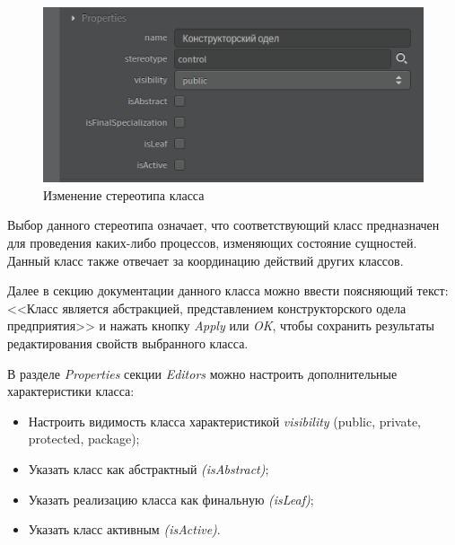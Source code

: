 \documentclass[a4paper,12pt]{report}
\begin{document}
\begin{figure}[h!]
	\centering
	\includegraphics[width=0.7\linewidth]{images/classeditors}
	\caption{Изменение стереотипа класса}
	\label{fig:classeditors}
\end{figure}


Выбор данного стереотипа означает, что соответствующий класс предназначен для проведения каких-либо процессов, изменяющих состояние сущностей. Данный класс также отвечает за координацию действий других классов.

Далее в секцию документации данного класса можно ввести поясняющий текст: <<Класс является абстракцией, представлением конструкторского одела предприятия>> и нажать кнопку \textit{Apply} или \textit{OK}, чтобы сохранить результаты редактирования свойств выбранного класса.



В разделе \textit{Properties} секции \textit{Editors} можно настроить дополнительные характеристики класса:
\begin{itemize}
	\item Настроить видимость класса характеристикой \textit{visibility} (public, private, protected, package);
	\item Указать класс как абстрактный \textit{(isAbstract)};
	\item Указать реализацию класса как финальную \textit{(isLeaf)};
	\item Указать класс активным \textit{(isActive)}.
\end{itemize}
\end{document}
